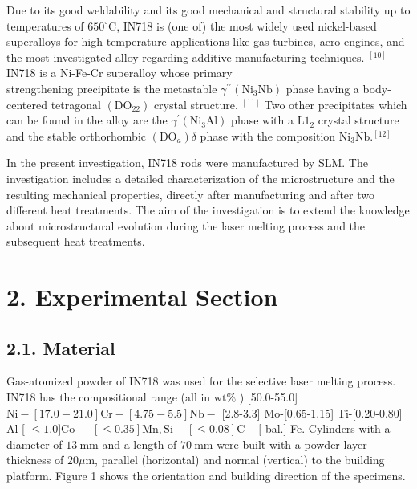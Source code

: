 \documentclass[10pt]{article}
\begin{document}
Due to its good weldability and its good mechanical and structural stability up to temperatures of $650^{\circ} \mathrm{C}$, IN718 is (one of) the most widely used nickel-based superalloys for high temperature applications like gas turbines, aero-engines, and the most investigated alloy regarding additive manufacturing techniques. ${ }^{[10]}$ IN718 is a Ni-Fe-Cr superalloy whose primary\\
strengthening precipitate is the metastable $\gamma^{\prime \prime}\left(\mathrm{Ni}_{3} \mathrm{Nb}\right)$ phase having a body-centered tetragonal $\left(\mathrm{DO}_{22}\right)$ crystal structure. ${ }^{[11]}$ Two other precipitates which can be found in the alloy are the $\gamma^{\prime}\left(\mathrm{Ni}_{3} \mathrm{Al}\right)$ phase with a $\mathrm{L1}_{2}$ crystal structure and the stable orthorhombic $\left(\mathrm{DO}_{a}\right) \delta$ phase with the composition $\mathrm{Ni}_{3} \mathrm{Nb} .{ }^{[12]}$

In the present investigation, IN718 rods were manufactured by SLM. The investigation includes a detailed characterization of the microstructure and the resulting mechanical properties, directly after manufacturing and after two different heat treatments. The aim of the investigation is to extend the knowledge about microstructural evolution during the laser melting process and the subsequent heat treatments.

\section*{2. Experimental Section}
\subsection*{2.1. Material}
Gas-atomized powder of IN718 was used for the selective laser melting process. IN718 has the compositional range (all in $\mathrm{wt} \%$ ) [50.0-55.0] $\mathrm{Ni}-[17.0-21.0] \mathrm{Cr}-[4.75-5.5] \mathrm{Nb}-$ [2.8-3.3] Mo-[0.65-1.15] Ti-[0.20-0.80] Al-[ $\leq 1.0] \mathrm{Co}-$ $[\leq 0.35] \mathrm{Mn}, \mathrm{Si}-[\leq 0.08] \mathrm{C}-[$ bal.] Fe. Cylinders with a diameter of $13 \mathrm{~mm}$ and a length of $70 \mathrm{~mm}$ were built with a powder layer thickness of $20 \mu \mathrm{m}$, parallel (horizontal) and normal (vertical) to the building platform. Figure 1 shows the orientation and building direction of the specimens.
\end{document}
